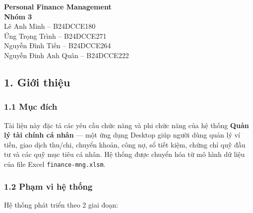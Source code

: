 \documentclass[11pt,a4paper]{article}
\author{}
\date{}
\begin{document}
\newpage
\thispagestyle{empty} %

\begin{titlepage} %
    \setlength{\parskip}{0pt} %
    \vfill
    \begin{center}
        {\Huge \textbf{Personal Finance Management}} \\[1.5cm]
        {\huge \textbf{Nhóm 3}} \\[0.5cm]
        Lê Anh Minh -- B24DCCE180 \\
        Ứng Trọng Trình -- B24DCCE271 \\
        Nguyễn Đình Tiến -- B24DCCE264 \\
        Nguyễn Đinh Anh Quân -- B24DCCE222
    \end{center}
    \vfill
\end{titlepage}

\newpage

\renewcommand{\contentsname}{\Large\textbf{Mục lục}}
\tableofcontents
\newpage

\subsection{1. Giới thiệu}\label{giux1edbi-thiux1ec7u}

\subsubsection{1.1 Mục đích}\label{mux1ee5c-ux111uxedch}

Tài liệu này đặc tả các yêu cầu chức năng và phi chức năng của hệ thống
\textbf{Quản lý tài chính cá nhân} --- một ứng dụng Desktop giúp người
dùng quản lý ví tiền, giao dịch thu/chi, chuyển khoản, công nợ, sổ tiết
kiệm, chứng chỉ quỹ đầu tư và các quỹ mục tiêu cá nhân. Hệ thống được
chuyển hóa từ mô hình dữ liệu của file Excel \texttt{finance-mng.xlsm}.

\subsubsection{1.2 Phạm vi hệ thống}\label{phux1ea1m-vi-hux1ec7-thux1ed1ng}

Hệ thống phát triển theo 2 giai đoạn:
\end{document}
